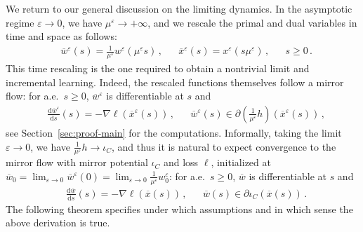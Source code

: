 \documentclass[11pt,english,reqno]{article}
\newcommand{\diff}{\mathrm{d}}
\renewcommand{\geq}{\geqslant}
\theoremstyle{plain}
\theoremstyle{definition}
\theoremstyle{remark}
\numberwithin{equation}{section}
\begin{document}
We return to our general discussion on the limiting dynamics. In the asymptotic regime $\varepsilon\to 0$, we have $\mu^\varepsilon \to + \infty$, and we rescale the primal and dual variables in time and space as follows:
\begin{align*}
	&\overline{w}^\varepsilon(s) = \frac{1}{\mu^\varepsilon} w^\varepsilon(\mu^\varepsilon s) \, , &&\overline{x}^\varepsilon(s) = x^\varepsilon(s \mu^\varepsilon) \, , &&s \geq 0 \, .
\end{align*}
This time rescaling is the one required to obtain a nontrivial limit and incremental learning. Indeed, the rescaled functions themselves follow a mirror flow: for a.e.~$s \geq 0$, $\overline{w}^\varepsilon$ is differentiable at $s$ and
\begin{align*}
	&\frac{\diff \overline{w}^\varepsilon}{\diff s}(s) = -\nabla \ell(\overline{x}^\varepsilon(s)) \, , &&\overline{w}^\varepsilon(s) \in \partial \left( \frac{1}{\mu^\varepsilon} h \right) (\overline{x}^\varepsilon(s)) \, ,
\end{align*}
see Section~\ref{sec:proof-main} for the computations. Informally, taking the limit $\varepsilon \to 0$, we have $\displaystyle \frac{1}{\mu^\varepsilon} h \to \iota_C$, and thus it is natural to expect convergence to the mirror flow with mirror potential $\iota_C$ and loss $\ell$, initialized at $\overline{w}_0 = \lim_{\varepsilon \to 0} \overline{w}^\varepsilon(0) = \lim_{\varepsilon \to 0} \frac{1}{\mu^\varepsilon} w^\varepsilon_0$: for a.e.~$s \geq 0$, $\overline{w}$ is differentiable at $s$ and
%
	\begin{align}
		\label{eq:limit_mirror_flow}
		&\frac{\diff\overline{w}}{\diff s}(s) = -\nabla \ell(\overline{x}(s)) \, , &&\overline{w}(s) \in \partial \iota_C(\overline{x}(s)) \, .
	\end{align}
%
The following theorem specifies under which assumptions and in which sense the above derivation is true.
%
\end{document}
